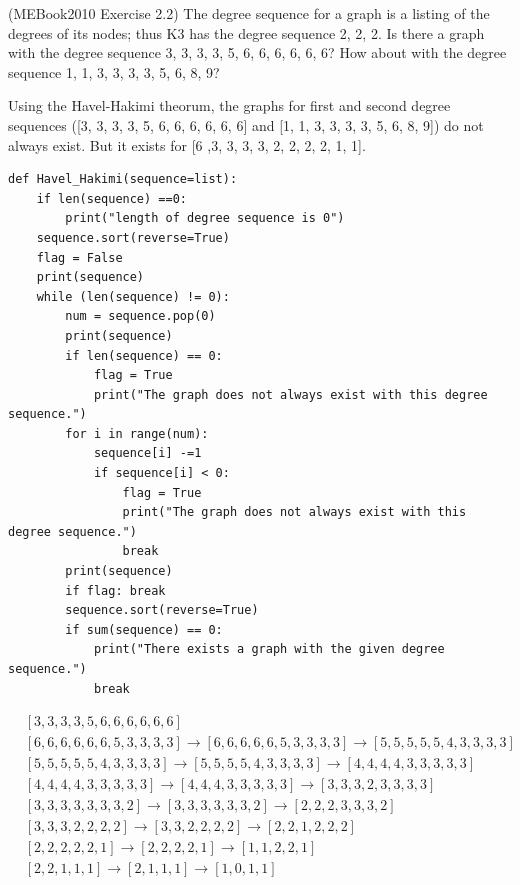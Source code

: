 \documentclass{article}
\begin{document}
\begin{problem}
    (MEBook2010 Exercise 2.2) The degree sequence for a graph is a listing of the degrees of its nodes; thus K3 has the degree sequence 2, 2, 2. Is there a graph with the degree sequence 3, 3, 3, 3, 5, 6, 6, 6, 6, 6, 6? How about with the degree sequence 1, 1, 3, 3, 3, 3, 5, 6, 8, 9?

    Using the Havel-Hakimi theorum, the graphs for first and second degree sequences ([3, 3, 3, 3, 5, 6, 6, 6, 6, 6, 6] and [1, 1, 3, 3, 3, 3, 5, 6, 8, 9]) do not always exist. But it exists for [6 ,3, 3, 3, 3, 2, 2, 2, 2, 1, 1]. 
\begin{verbatim}
def Havel_Hakimi(sequence=list):
    if len(sequence) ==0:
        print("length of degree sequence is 0")
    sequence.sort(reverse=True)
    flag = False
    print(sequence)
    while (len(sequence) != 0):
        num = sequence.pop(0)
        print(sequence)
        if len(sequence) == 0:
            flag = True
            print("The graph does not always exist with this degree sequence.")
        for i in range(num):
            sequence[i] -=1
            if sequence[i] < 0:
                flag = True
                print("The graph does not always exist with this degree sequence.")
                break
        print(sequence)
        if flag: break
        sequence.sort(reverse=True)
        if sum(sequence) == 0:
            print("There exists a graph with the given degree sequence.")
            break
\end{verbatim}
\begin{align*}
&[3, 3, 3, 3, 5, 6, 6, 6, 6, 6, 6]\\
&[6, 6, 6, 6, 6, 6, 5, 3, 3, 3, 3] 
\rightarrow [6, 6, 6, 6, 6, 5, 3, 3, 3, 3]
\rightarrow [5, 5, 5, 5, 5, 4, 3, 3, 3, 3]\\
&[5, 5, 5, 5, 5, 4, 3, 3, 3, 3]
\rightarrow [5, 5, 5, 5, 4, 3, 3, 3, 3]
\rightarrow [4, 4, 4, 4, 3, 3, 3, 3, 3]\\
&[4, 4, 4, 4, 3, 3, 3, 3, 3]
\rightarrow [4, 4, 4, 3, 3, 3, 3, 3]
\rightarrow [3, 3, 3, 2, 3, 3, 3, 3]\\
&[3, 3, 3, 3, 3, 3, 3, 2]
\rightarrow [3, 3, 3, 3, 3, 3, 2]
\rightarrow [2, 2, 2, 3, 3, 3, 2]\\
&[3, 3, 3, 2, 2, 2, 2]
\rightarrow [3, 3, 2, 2, 2, 2]
\rightarrow [2, 2, 1, 2, 2, 2]\\
&[2, 2, 2, 2, 2, 1]
\rightarrow [2, 2, 2, 2, 1]
\rightarrow [1, 1, 2, 2, 1]\\
&[2, 2, 1, 1, 1]
\rightarrow [2, 1, 1, 1]
\rightarrow [1, 0, 1, 1]\\

\end{align*}
\end{problem}
\end{document}

